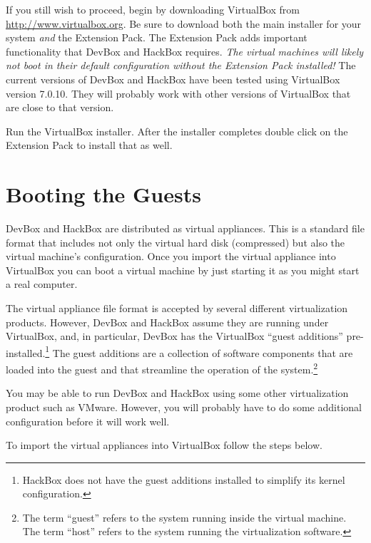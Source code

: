 \documentclass[twocolumn]{article}
\begin{document}
If you still wish to proceed, begin by downloading VirtualBox from
\url{http://www.virtualbox.org}. Be sure to download both the main installer for your system
\emph{and} the Extension Pack. The Extension Pack adds important functionality that DevBox and
HackBox requires. \emph{The virtual machines will likely not boot in their default configuration
  without the Extension Pack installed!} The current versions of DevBox and HackBox have been
tested using VirtualBox version 7.0.10. They will probably work with other versions of
VirtualBox that are close to that version.

Run the VirtualBox installer. After the installer completes double click on the Extension Pack
to install that as well.

\section{Booting the Guests}
\label{sec:booting-guests}

DevBox and HackBox are distributed as virtual appliances. This is a standard file format that
includes not only the virtual hard disk (compressed) but also the virtual machine's
configuration. Once you import the virtual appliance into VirtualBox you can boot a virtual
machine by just starting it as you might start a real computer.

The virtual appliance file format is accepted by several different virtualization products.
However, DevBox and HackBox assume they are running under VirtualBox, and, in particular, DevBox
has the VirtualBox ``guest additions'' pre-installed.\footnote{HackBox does not have the guest
  additions installed to simplify its kernel configuration.} The guest additions are a
collection of software components that are loaded into the guest and that streamline the
operation of the system.\footnote{The term ``guest'' refers to the system running inside the
  virtual machine. The term ``host'' refers to the system running the virtualization software.}

You may be able to run DevBox and HackBox using some other virtualization product such as
VMware. However, you will probably have to do some additional configuration before it will work
well.

To import the virtual appliances into VirtualBox follow the steps below.
\end{document}
